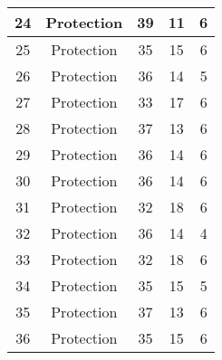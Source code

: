 \documentclass[results.tex]{subfiles}
\begin{document}
\begin{center}
\begin{tabular}{| c || c | c | c | c |}
            \hline
            24                      & Protection                   & 39                     & 11                      & 6                    \\
            \hline
            25                      & Protection                   & 35                     & 15                      & 6                    \\
            \hline
            26                      & Protection                   & 36                     & 14                      & 5                    \\
            \hline
            27                      & Protection                   & 33                     & 17                      & 6                    \\
            \hline
            28                      & Protection                   & 37                     & 13                      & 6                    \\
            \hline
            29                      & Protection                   & 36                     & 14                      & 6                    \\
            \hline
            30                      & Protection                   & 36                     & 14                      & 6                    \\
            \hline
            31                      & Protection                   & 32                     & 18                      & 6                    \\
            \hline
            32                      & Protection                   & 36                     & 14                      & 4                    \\
            \hline
            33                      & Protection                   & 32                     & 18                      & 6                    \\
            \hline
            34                      & Protection                   & 35                     & 15                      & 5                    \\
            \hline
            35                      & Protection                   & 37                     & 13                      & 6                    \\
            \hline
            36                      & Protection                   & 35                     & 15                      & 6                    \\

\end{tabular}
\end{center}
\end{document}
